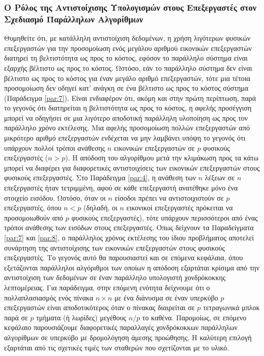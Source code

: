 \documentclass[12pt,a4paper]{article}
\begin{document}
\subsubsection*{Ο Ρόλος της Αντιστοίχισης Υπολογισμών στους Επεξεργαστές στον \\ Σχεδιασμό Παράλληλων Αλγορίθμων}
Θυμηθείτε ότι, με κατάλληλη αντιστοίχιση δεδομένων, η χρήση λιγότερων 
φυσικών επεξεργαστών για την προσομοίωση ενός μεγάλου αριθμού εικονικών 
επεξεργαστών διατηρεί τη βελτιστότητα ως προς το κόστος, εφόσον το παράλληλο 
σύστημα είναι εξαρχής βέλτιστο ως προς το κόστος. Ωστόσο, εάν το παράλληλο 
σύστημα δεν είναι βέλτιστο ως προς το κόστος για έναν μεγάλο αριθμό 
επεξεργαστών, τότε μια τέτοια προσομοίωση δεν οδηγεί κατ’ ανάγκη σε ένα 
βέλτιστο ως προς το κόστος σύστημα (Παράδειγμα \ref{par:7}). Είναι 
ενδιαφέρον ότι, ακόμη και στην πρώτη περίπτωση, παρά το γεγονός ότι 
διατηρείται η βελτιστότητα ως προς το κόστος, η αφελής προσέγγιση μπορεί 
να οδηγήσει σε μια λιγότερο αποδοτική παράλληλη υλοποίηση ως προς τον 
παράλληλο χρόνο εκτέλεσης. Μια αφελής προσομοίωση πολλών επεξεργαστών από 
μικρότερο αριθμό επεξεργαστών ενδέχεται να μην λαμβάνει υπόψη το γεγονός 
ότι υπάρχουν πολλοί τρόποι ανάθεσης $n$ εικονικών επεξεργαστών σε $p$ 
φυσικούς επεξεργαστές ($n > p$). Η απόδοση του αλγορίθμου μετά την 
κλιμάκωση προς τα κάτω μπορεί να διαφέρει για διαφορετικές αντιστοιχίσεις 
των εικονικών επεξεργαστών στους φυσικούς επεξεργαστές. Στο Παράδειγμα
\ref{par:4}, η ανάθεση των $n$ λέξεων σε $n$ επεξεργαστές ήταν τετριμμένη, 
αφού σε κάθε επεξεργαστή ανατέθηκε μόνο ένα στοιχείο εισόδου. Ωστόσο, 
όταν οι $n$ είσοδοι πρέπει να αντιστοιχιστούν σε $p$ επεξεργαστές, όπου 
$n < p$ (δηλαδή, οι $n$ εικονικοί επεξεργαστές πρόκειται να προσομοιωθούν 
από $p$ φυσικούς επεξεργαστές), τότε υπάρχουν περισσότεροι από ένας τρόποι 
ανάθεσης των εισόδων στους επεξεργαστές. Όπως δείχνουν τα Παραδείγματα 
\ref{par:7} και \ref{par:8}, ο παράλληλος χρόνος εκτέλεσης του ίδιου 
προβλήματος αποτελεί συνάρτηση της αντιστοίχισης των εικονικών επεξεργαστών 
στους φυσικούς επεξεργαστές. Το γεγονός αυτό θα παρουσιαστεί και σε 
επόμενα κεφάλαια, όπου εξετάζονται παράλληλοι αλγόριθμοι των οποίων η 
απόδοση εξαρτάται κρίσιμα από την αντιστοίχιση των δεδομένων σε έναν 
παράλληλο υπολογιστή χονδρόκοκκης λεπτομέρειας. Για παράδειγμα, στην 
επόμενη ενότητα δείχνουμε ότι ο πολλαπλασιασμός ενός πίνακα $n \times n$ 
με ένα διάνυσμα σε έναν υπερκύβο $p$ επεξεργαστών είναι αποδοτικότερος όταν 
ο πίνακας διαιρείται σε $p$ τετραγωνικά μπλοκ παρά σε $p$ τμήματα (ή λωρίδες) 
μεγέθους $n/p$ το καθένα. Παρομοίως, σε επόμενο κεφάλαιο παρουσιάζουμε 
διαφορετικές παραλλαγές χονδρόκοκκων παράλληλων αλγορίθμων σε υπερκύβο 
με δρομολόγηση άμεσης προώθησης. Η καλύτερη επιλογή εξαρτάται από τις 
σχετικές τιμές των σταθερών που σχετίζονται με το υλικό.
\end{document}
